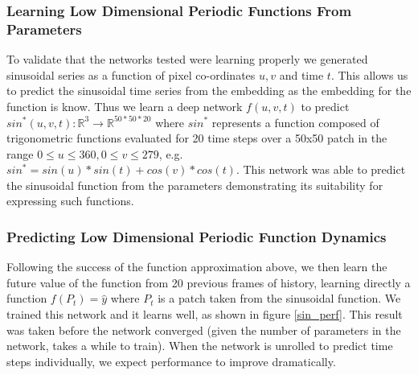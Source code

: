\documentclass[10pt,letterpaper]{article}
\begin{document}
\subsubsection{Learning Low Dimensional Periodic Functions From Parameters}
To validate that the networks tested were learning properly we generated sinusoidal series as a function of pixel co-ordinates $u,v$ and time $t$. This allows us to predict the sinusoidal time series from the embedding as the embedding for the function is know. Thus we learn a deep network $f(u,v,t)$ to predict $sin^*(u,v,t) : \mathbb{R}^3 \longrightarrow \mathbb{R}^{50*50*20}$ where $sin^*$ represents a function composed of trigonometric functions evaluated for 20 time steps over a 50x50 patch in the range $0 \leq u \leq 360, 0 \leq v \leq 279$, e.g. $sin^* = sin(u) * sin(t) + cos(v) * cos(t)$. This network was able to predict the sinusoidal function from the parameters demonstrating its suitability for expressing such functions.


\subsubsection{Predicting Low Dimensional Periodic Function Dynamics}
Following the success of the function approximation above, we then learn the future value of the function from 20 previous frames of history, learning directly a function $f(P_t) = \hat{y}$ where $P_t$ is a patch taken from the sinusoidal function. We trained this network and it learns well, as shown in figure \ref{sin_perf}. This result was taken before the network converged (given the number of parameters in the network, takes a while to train). When the network is unrolled to predict time steps individually, we expect performance to improve dramatically.
\end{document}
